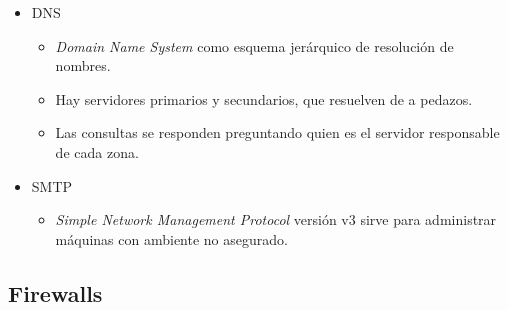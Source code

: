 \begin{itemize}
	\item DNS
	\begin{itemize}
		\item \textit{Domain Name System} como esquema jerárquico de resolución de nombres.
		\item Hay servidores primarios y secundarios, que resuelven de a pedazos.
		\item Las consultas se responden preguntando quien es el servidor responsable de cada zona.
	\end{itemize}
	\item SMTP
	\begin{itemize}
		\item \textit{Simple Network Management Protocol} versión v3 sirve para administrar máquinas con ambiente no asegurado.
	\end{itemize}
\end{itemize}

\subsection{Firewalls}

